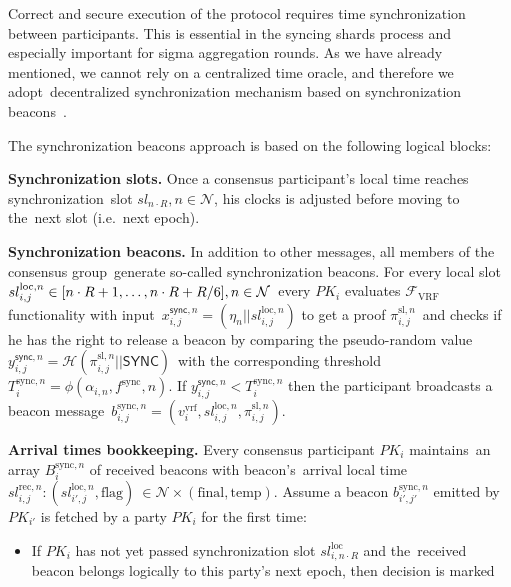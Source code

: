 Correct and secure execution of the protocol requires time synchronization between participants.
This is essential in the syncing shards process and especially important for sigma aggregation rounds.
As we have already mentioned, we cannot rely on a centralized time oracle, and therefore we adopt\
decentralized synchronization mechanism based on synchronization beacons~\cite{cryptoeprint:2019/838}.

The synchronization beacons approach is based on the following logical blocks:
\begin{legal}
    \item[]\textbf{Synchronization slots.} Once a consensus participant’s local time reaches synchronization\
    slot ${sl_{n \cdot R}, n \in \mathcal{N}}$, his clocks is adjusted before moving to the\
    next slot (i.e.\ next epoch).
    \item[]\textbf{Synchronization beacons.} In addition to other messages, all members of the consensus group\
    generate so-called synchronization beacons.
    For every local slot $sl_{i, j}^{\text{loc}, n} \in [n \cdot R + 1,\dots,n \cdot R + R \// 6], n \in \mathcal{N}$\
    every $PK_i$ evaluates $\mathcal{F}_{\text{VRF}}$ functionality with input\
    ${x_{i, j}^{\textsf{sync}, n} = (\eta_n || sl_{i, j}^{\text{loc}, n})}$ to get a proof $\pi_{i, j}^{\text{sl}, n}$\
    and checks if he has the right to release a beacon by comparing the pseudo-random value\
    ${y_{i, j}^{\textsf{sync}, n} = \mathcal{H}(\pi_{i, j}^{\text{sl}, n} || \textsf{SYNC})}$\
    with the corresponding threshold $T_{i}^{\text{sync}, n} = \phi(\alpha_{i, n}, f^{\text{sync}}, n)$.
    If ${y_{i, j}^{\textsf{sync}, n} < T_{i}^{\text{sync}, n}}$ then the participant broadcasts a beacon message\
    $b_{i, j}^{\text{sync}, n} = (v^{\text{vrf}}_i, sl_{i, j}^{\text{loc}, n}, \pi_{i, j}^{\text{sl}, n})$.
    \item[]\textbf{Arrival times bookkeeping.} Every consensus participant $PK_i$ maintains\
    an array $B_i^{\text{sync}, n}$ of received beacons with beacon's\
    arrival local time ${sl^{\text{rec}, n}_{i, j}: (sl_{i', j}^{\text{loc}, n}, \text{flag})\
    \in \mathcal{N} \times (\text{final}, \text{temp})}$.
    Assume a beacon $b_{i', j'}^{\text{sync}, n}$ emitted by $PK_{i'}$ is fetched by a party $PK_i$ for the first time:
    \begin{itemize}
        \item If $PK_i$ has not yet passed synchronization slot $sl_{i, n \cdot R}^{\text{loc}}$ and the\
        received beacon belongs logically to this party’s next epoch, then decision is marked\

\end{itemize}
\end{legal}
